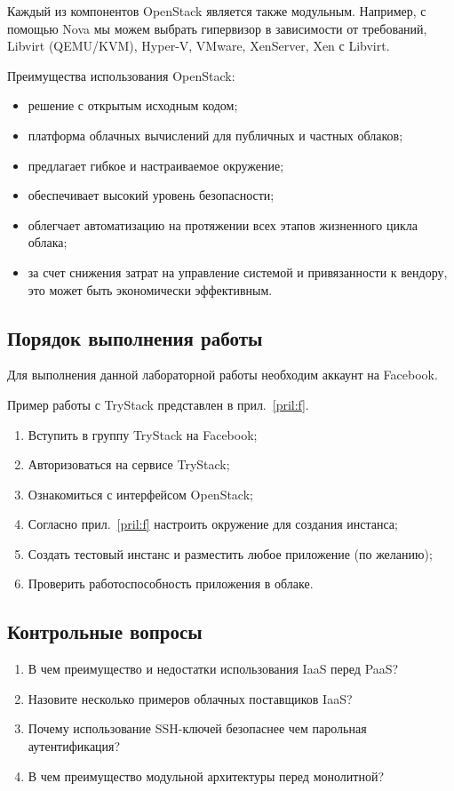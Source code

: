 Каждый из компонентов OpenStack является также модульным.
Например, с помощью Nova мы можем выбрать гипервизор в зависимости от требований, Libvirt (QEMU/KVM), Hyper-V, VMware, XenServer, Xen с Libvirt.

Преимущества использования OpenStack:
\begin{itemize}
    \item решение с открытым исходным кодом;
    \item платформа облачных вычислений для публичных и частных облаков;
    \item предлагает гибкое и настраиваемое окружение;
    \item обеспечивает высокий уровень безопасности;
    \item облегчает автоматизацию на протяжении всех этапов жизненного цикла облака;
    \item за счет снижения затрат на управление системой и привязанности к вендору, это может быть экономически эффективным.
\end{itemize}

\subsection{Порядок выполнения работы}

Для выполнения данной лабораторной работы необходим аккаунт на Facebook.

Пример работы с TryStack представлен в прил.~\ref{pril:f}.

\begin{enumerate}
    \item Вступить в группу TryStack на Facebook;
    \item Авторизоваться на сервисе TryStack;
    \item Ознакомиться с интерфейсом OpenStack;
    \item Согласно прил.~\ref{pril:f} настроить окружение для создания инстанса;
    \item Создать тестовый инстанс и разместить любое приложение (по желанию);
    \item Проверить работоспособность приложения в облаке.
\end{enumerate}

\subsection{Контрольные вопросы}
\begin{enumerate}
    \item В чем преимущество и недостатки использования IaaS перед PaaS?
    \item Назовите несколько примеров облачных поставщиков IaaS?
    \item Почему использование SSH-ключей безопаснее чем парольная аутентификация?
    \item В чем преимущество модульной архитектуры перед монолитной?
\end{enumerate}

\clearpage
